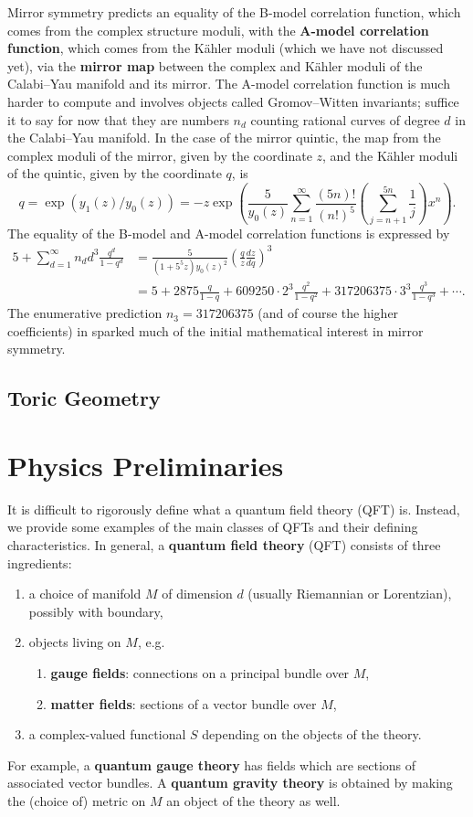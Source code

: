 \documentclass{report}
\theoremstyle{plain}
\theoremstyle{definition}
\theoremstyle{remark}
\begin{document}
Mirror symmetry predicts an equality of the B-model correlation
function, which comes from the complex structure moduli, with the {\bf
  A-model correlation function}, which comes from the K\"ahler moduli
(which we have not discussed yet), via the {\bf mirror map} between
the complex and K\"ahler moduli of the Calabi--Yau manifold and its
mirror. The A-model correlation function is much harder to compute and
involves objects called Gromov--Witten invariants; suffice it to say
for now that they are numbers $n_d$ counting rational curves of degree
$d$ in the Calabi--Yau manifold. In the case of the mirror quintic,
the map from the complex moduli of the mirror, given by the coordinate
$z$, and the K\"ahler moduli of the quintic, given by the coordinate
$q$, is
\[ q = \exp(y_1(z)/y_0(z)) = -z \exp\left(\frac{5}{y_0(z)} \sum_{n=1}^\infty \frac{(5n)!}{(n!)^5} \left(\sum_{j=n+1}^{5n} \frac{1}{j}\right) x^n\right). \]
The equality of the B-model and A-model correlation functions is
expressed by
\begin{align*}
  5 + \sum_{d=1}^\infty n_d d^3 \frac{q^d}{1 - q^d}
  &= \frac{5}{(1 + 5^5z) y_0(z)^2} \left(\frac{q}{z} \frac{dz}{dq}\right)^3 \\
  &= 5 + 2875 \frac{q}{1-q} + 609250 \cdot 2^3 \frac{q^2}{1 - q^2} + 317206375 \cdot 3^3 \frac{q^3}{1 - q^3} + \cdots.
\end{align*}
The enumerative prediction $n_3 = 317206375$ (and of course the higher
coefficients) in \cite{Candelas1991a} sparked much of the initial
mathematical interest in mirror symmetry.

\section{Toric Geometry}

\chapter{Physics Preliminaries}

It is difficult to rigorously define what a quantum field theory (QFT)
is. Instead, we provide some examples of the main classes of QFTs and
their defining characteristics. In general, a {\bf quantum field
  theory} (QFT) consists of three ingredients:
\begin{enumerate}
\item a choice of manifold $M$ of dimension $d$ (usually Riemannian or
  Lorentzian), possibly with boundary,
\item objects living on $M$, e.g.
  \begin{enumerate}
  \item {\bf gauge fields}: connections on a principal bundle over
    $M$,
  \item {\bf matter fields}: sections of a vector bundle over $M$,
  \end{enumerate}
\item a complex-valued functional $S$ depending on the objects of the
  theory.
\end{enumerate}
For example, a \textbf{quantum gauge theory} has fields which are
sections of associated vector bundles. A \textbf{quantum gravity
  theory} is obtained by making the (choice of) metric on $M$ an
object of the theory as well.
\end{document}
